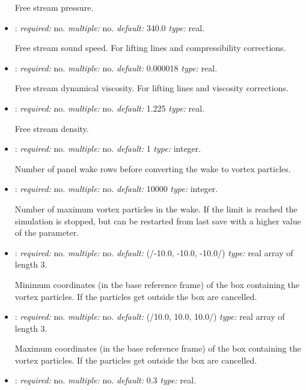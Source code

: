 \begin{itemize}
Free stream pressure.

\item {}: \textit{required:} no. \textit{multiple:} no. 
\textit{default:} 340.0 \textit{type:} real.

Free stream sound speed. For lifting lines and compressibility corrections.


\item {}: \textit{required:} no. \textit{multiple:} no. 
\textit{default:} 0.000018 \textit{type:} real.

Free stream dynamical viscosity. For lifting lines and viscosity corrections.

\item {}: \textit{required:} no. \textit{multiple:} no. 
\textit{default:} 1.225 \textit{type:} real.

Free stream density.

\item {}: \textit{required:} no. \textit{multiple:} no. 
\textit{default:} 1 \textit{type:} integer.

Number of panel wake rows before converting the wake to vortex particles.


\item {}: \textit{required:} no. \textit{multiple:} no. 
\textit{default:} 10000 \textit{type:} integer.

Number of maximum vortex particles in the wake. If the limit is reached the simulation is stopped, but can be restarted from last save with a higher value of the parameter. 


\item {}: \textit{required:} no. \textit{multiple:} no. 
\textit{default:} (/-10.0, -10.0, -10.0/) \textit{type:} real array of length 3.

Minimum coordinates (in the base reference frame) of the box containing the vortex 
particles. If the particles get outside the box are cancelled.

\item {}: \textit{required:} no. \textit{multiple:} no. 
\textit{default:} (/10.0, 10.0, 10.0/) \textit{type:} real array of length 3.

Maximum coordinates (in the base reference frame) of the box containing the vortex 
particles. If the particles get outside the box are cancelled.

\item {}: \textit{required:} no. \textit{multiple:} no. 
\textit{default:} 0.3 \textit{type:} real.


\end{itemize}
